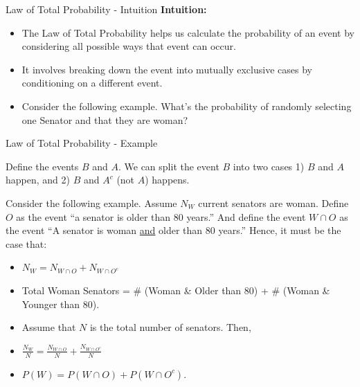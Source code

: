 \documentclass[handout]{beamer} %
\begin{document}
\begin{frame}{Law of Total Probability - Intuition}
    \textbf{Intuition:} \pause
    \begin{itemize}
        \item The Law of Total Probability helps us calculate the probability of an event by considering all possible ways that event can occur.\pause
        \item It involves breaking down the event into mutually exclusive cases by conditioning on a different event.\pause
        \item Consider the following example. What's the probability of randomly selecting one Senator and that they are woman?
    \end{itemize}
\end{frame}

\begin{frame}{Law of Total Probability - Example}
    
Define the events $B$ and $A$. We can split the event $B$ into two cases 1) $B$ and $A$ happen, and 2) $B$ and $A^c$ (not $A$) happens.  \newline
\vspace{0.5em}


Consider the following example. Assume $N_W$ current senators are woman. Define $O$ as the event ``a senator is older than 80 years.'' And define the event $W \cap O$ as the event ``A senator is woman \underline{and} older than 80 years.'' Hence, it must be the case that:
\begin{itemize}
    \item $N_W = N_{W\cap O} + N_{W\cap O^c}$
    \item Total Woman Senators = \# (Woman \& Older than 80) + \# (Woman \& Younger than 80).
    \item Assume that $N$ is the total number of senators. Then,
    \item $\frac{N_W}{N} = \frac{N_{W\cap O}}{N}+ \frac{N_{W\cap O^c}}{N}$
    \item $P(W) = P(W \cap O) + P(W \cap O^c)$. 
\end{itemize}
\end{frame}

\end{document}
